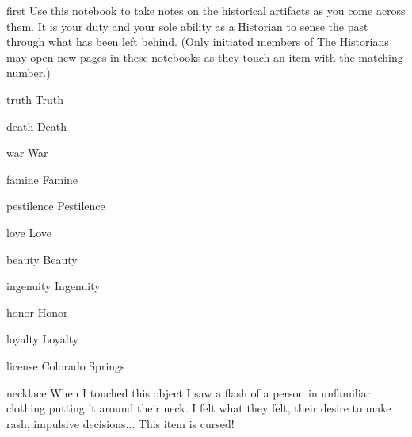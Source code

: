 \documentclass[notebook]{Silversiders} %
\begin{document}
\startnotebook{\nHistorian{}}

\begin{page}{first}
Use this notebook to take notes on the historical artifacts as you come across them. It is your duty and your sole ability as a Historian to sense the past through what has been left behind. (Only initiated members of The Historians may open new pages in these notebooks as they touch an item with the matching number.)
\end{page}

\begin{page}[Item 00001]{truth}
Truth
\end{page}

\begin{page}[Item 00003]{death}
Death
\end{page}

\begin{page}[Item 00004]{war}
War
\end{page}

\begin{page}[Item 00005]{famine}
Famine
\end{page}

\begin{page}[Item 00006]{pestilence}
Pestilence
\end{page}

\begin{page}[Item 00007]{love}
Love
\end{page}

\begin{page}[Item 00011]{beauty}
Beauty
\end{page}

\begin{page}[Item 00013]{ingenuity}
Ingenuity
\end{page}

\begin{page}[Item 00015]{honor}
Honor
\end{page}

\begin{page}[Item 00017]{loyalty}
Loyalty
\end{page}

\begin{page}[Item 00018]{license}
Colorado Springs
\end{page}

\begin{page}[Item 50008]{necklace}
When I touched this object I saw a flash of a person in unfamiliar clothing putting it around their neck. I felt what they felt, their desire to make rash, impulsive decisions... This item is cursed!
\end{page}

\endnotebook
\end{document}
